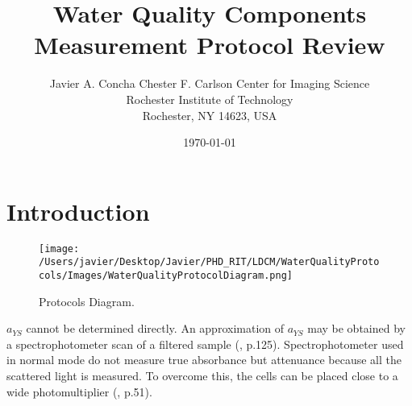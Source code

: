 \documentclass[]{spie}  %
\title{Water Quality Components \\ Measurement Protocol Review}
\author{{\LARGE Javier A. Concha}
\skiplinehalf
{\normalsize Chester F. Carlson Center for Imaging Science\\ Rochester Institute of Technology\\Rochester, NY 14623, USA\\}
}
\date{\today}
\begin{document}
 
  \maketitle 

  \tableofcontents




\newpage
\section{Introduction}
\begin{figure}[h]
\centering
    \texttt{[image: /Users/javier/Desktop/Javier/PHD\_RIT/LDCM/WaterQualityProtocols/Images/WaterQualityProtocolDiagram.png]}%
    \vspace{0.5cm}
   \caption[]{\label{fig:ProtocolsDiagram} Protocols Diagram.}
\end{figure}

$a_{YS}$ cannot be determined directly. An approximation of $a_{YS}$ may be obtained by a spectrophotometer scan of a filtered sample (\citet{Bukata1995}, p.125). Spectrophotometer used in normal mode do not measure true absorbance but {\color{red} attenuance} because all the scattered light is measured. To overcome this, the cells can be placed close to a wide photomultiplier (\citet{Kirk1983}, p.51).
\newpage
\end{document}

